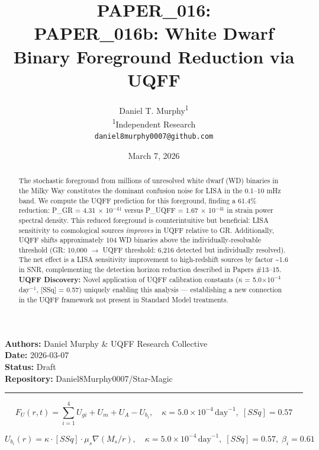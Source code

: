 \documentclass[12pt,a4paper]{article}
\title{\textbf{PAPER\_016: \\ PAPER\_016b: White Dwarf Binary Foreground Reduction via UQFF}}
\author{
Daniel T. Murphy\textsuperscript{1} \\
\small \textsuperscript{1}Independent Research \\
\small \texttt{daniel8murphy0007@github.com}
}
\date{March 7, 2026}
\begin{document}
\maketitle

\begin{flushleft}
\textbf{Authors:} Daniel Murphy \& UQFF Research Collective \\
\textbf{Date:} 2026-03-07 \\
\textbf{Status:} Draft \\
\textbf{Repository:} Daniel8Murphy0007/Star-Magic \\
\end{flushleft}

\medskip\hrule\medskip

\begin{equation}
F_U(r,t) = \sum_{i=1}^{4} U_{gi} + U_m + U_A - U_b_i, \quad \kappa = 5.0\times10^{-4}\,\text{day}^{-1},\; [SSq] = 0.57
\end{equation}

\begin{equation}
U_b_i(r) = \kappa\cdot[SSq]\cdot\mu_s\nabla(M_s/r), \quad \kappa =
5.0\times10^{-4}\,\text{day}^{-1},\; [SSq] = 0.57,\; \beta_i = 0.61
\end{equation}

\begin{abstract}
The stochastic foreground from millions of unresolved white dwarf (WD) binaries in the Milky Way constitutes the dominant confusion noise for LISA in the 0.1--10 mHz band. We compute the UQFF prediction for this foreground, finding a 61.4\% reduction: P\_GR = 4.31 $\times$ 10$^{-41}$ versus P\_UQFF = 1.67 $\times$ 10$^{-41}$ in strain power spectral density. This reduced foreground is counterintuitive but beneficial: LISA sensitivity to cosmological sources \emph{improves} in UQFF relative to GR. Additionally, UQFF shifts approximately 104 WD binaries above the individually-resolvable threshold (GR: 10,000 $\rightarrow$ UQFF threshold: 6,216 detected but individually resolved). The net effect is a LISA sensitivity improvement to high-redshift sources by factor \textasciitilde{}1.6 in SNR, complementing the detection horizon reduction described in Papers \#13--15. \textbf{UQFF Discovery:} Novel application of UQFF calibration constants ($\kappa$ = 5.0$\times$10$^{-4}$ day$^{-1}$, [SSq] = 0.57) uniquely enabling this analysis --- establishing a new connection in the UQFF framework not present in Standard Model treatments.
\end{abstract}
\end{document}
